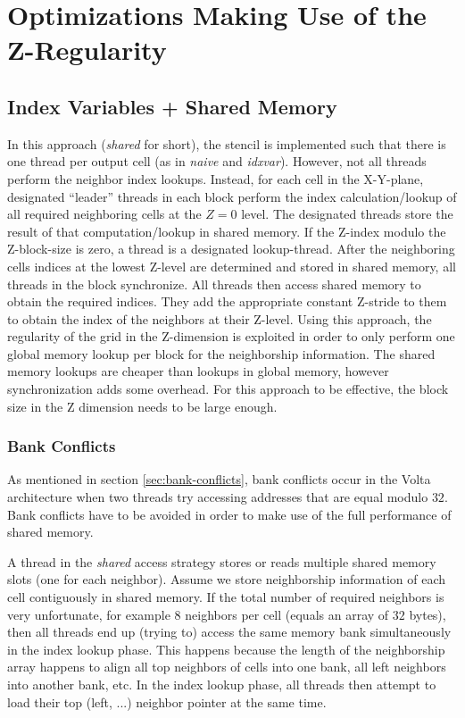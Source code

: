 \section{Optimizations Making Use of the Z-Regularity}

\subsection{Index Variables + Shared Memory} In this approach (\emph{shared} for short), the stencil is implemented such that there is one thread per output cell (as in \emph{naive} and \emph{idxvar}). However, not all threads perform the neighbor index lookups. Instead, for each cell in the X-Y-plane, designated ``leader'' threads in each block perform the index calculation/lookup of all required neighboring cells at the $Z=0$ level. The designated threads store the result of that computation/lookup in shared memory. If the Z-index modulo the Z-block-size is zero, a thread is a designated lookup-thread. After the neighboring cells indices at the lowest Z-level are determined and stored in shared memory, all threads in the block synchronize. All threads then access shared memory to obtain the required indices. They add the appropriate constant Z-stride to them to obtain the index of the neighbors at their Z-level. Using this approach, the regularity of the grid in the Z-dimension is exploited in order to only perform one global memory lookup per block for the neighborship information. The shared memory lookups are cheaper than lookups in global memory, however synchronization adds some overhead. For this approach to be effective, the block size in the Z dimension needs to be large enough.

\subsubsection{Bank Conflicts}

As mentioned in section \ref{sec:bank-conflicts}, bank conflicts occur in the Volta architecture when two threads try accessing addresses that are equal modulo $32$. Bank conflicts have to be avoided in order to make use of the full performance of shared memory.

A thread in the \emph{shared} access strategy stores or reads multiple shared memory slots (one for each neighbor). Assume we store neighborship information of each cell contiguously in shared memory. If the total number of required neighbors is very unfortunate, for example $8$ neighbors per cell (equals an array of $32$ bytes), then all threads end up (trying to) access the same memory bank simultaneously in the index lookup phase. This happens because the length of the neighborship array happens to align all top neighbors of cells into one bank, all left neighbors into another bank, etc. In the index lookup phase, all threads then attempt to load their top (left, ...) neighbor pointer at the same time.

